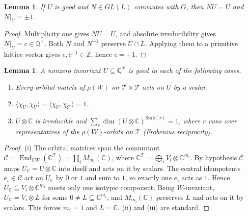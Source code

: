 \documentclass[11pt]{amsart}
\newtheorem{lemma}[theorem]{Lemma}
\theoremstyle{definition}
\newcommand{\Z}{\mathbb{Z}}
\newcommand{\Q}{\mathbb{Q}}
\newcommand{\C}{\mathbb{C}}
\newcommand{\T}{\mathcal{T}}
\newcommand{\End}{\operatorname{End}}
\begin{document}
\begin{lemma}\label{lem:schur}
If $U$ is good and $N\in GL(L)$ commutes with $G$, then $NU=U$ and $N|_U=\pm1$.
\end{lemma}
\begin{proof}
Multiplicity one gives $NU=U$, and absolute irreducibility gives $N|_U=c\in\Q^\times$.
Both $N$ and $N^{-1}$ preserve $U\cap L$. Applying them to a primitive lattice vector gives
$c,c^{-1}\in\Z$, hence $c=\pm1$.
\end{proof}

\begin{lemma}\label{lem:cert}
A nonzero invariant $U\subseteq\Q^\T$ is good in each of the following cases.
\begin{enumerate}[label=(\roman*)]
\item Every orbital matrix of $\rho(W)$ on $\T\times\T$ acts on $U$ by a scalar.
\item $\langle\chi_U,\chi_U\rangle=\langle\chi_U,\chi_\T\rangle=1$.
\item $U\otimes\C$ is irreducible and $\sum_r\dim(U\otimes\C)^{\mathrm{Stab}(r)}=1$, where $r$ runs over
representatives of the $\rho(W)$-orbits on $\T$ (Frobenius reciprocity).
\end{enumerate}
\end{lemma}
\begin{proof}
(i) The orbital matrices span the commutant $\mathcal C=\End_{\C W}(\C^\T)=\prod_iM_{m_i}(\C)$, where
$\C^\T=\bigoplus_iV_i\otimes\C^{m_i}$. By hypothesis $\mathcal C$ maps $U_\C=U\otimes\C$ into itself and acts on it
by scalars. The central idempotents $e_i\in\mathcal C$ act on $U_\C$ by $0$ or $1$ and sum to $1$, so exactly one
$e_i$ acts as $1$. Hence $U_\C\subseteq V_i\otimes\C^{m_i}$ meets only one isotypic component. Being
$W$-invariant, $U_\C=V_i\otimes L$ for some $0\ne L\subseteq\C^{m_i}$, and $M_{m_i}(\C)$ preserves $L$ and acts on it
by scalars. This forces $m_i=1$ and $L=\C$. (ii) and (iii) are standard.
\end{proof}
\end{document}
